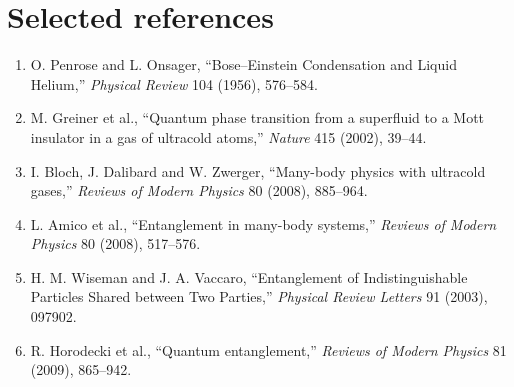\documentclass[11pt,a4paper]{article}
\begin{document}
\section{Selected references}
\begin{enumerate}[leftmargin=*]
\item O. Penrose and L. Onsager, ``Bose--Einstein Condensation and Liquid Helium,'' \emph{Physical Review} 104 (1956), 576--584.
\item M. Greiner et al., ``Quantum phase transition from a superfluid to a Mott insulator in a gas of ultracold atoms,'' \emph{Nature} 415 (2002), 39--44.
\item I. Bloch, J. Dalibard and W. Zwerger, ``Many-body physics with ultracold gases,'' \emph{Reviews of Modern Physics} 80 (2008), 885--964.
\item L. Amico et al., ``Entanglement in many-body systems,'' \emph{Reviews of Modern Physics} 80 (2008), 517--576.
\item H. M. Wiseman and J. A. Vaccaro, ``Entanglement of Indistinguishable Particles Shared between Two Parties,'' \emph{Physical Review Letters} 91 (2003), 097902.
\item R. Horodecki et al., ``Quantum entanglement,'' \emph{Reviews of Modern Physics} 81 (2009), 865--942.
\end{enumerate}
\end{document}
